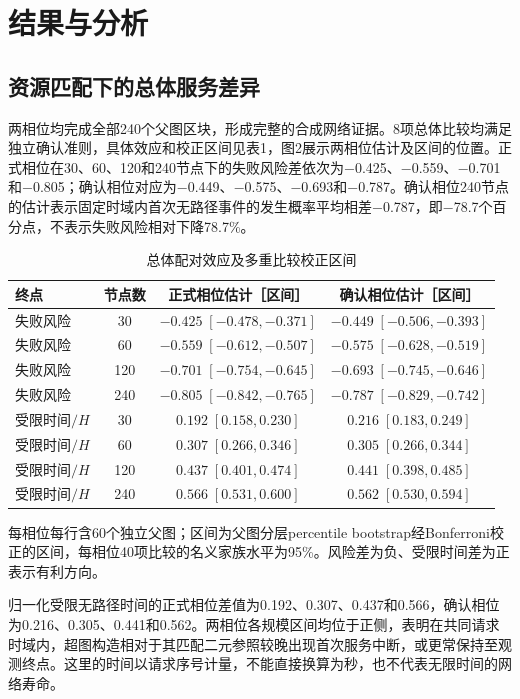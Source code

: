 \documentclass[UTF8,a4paper,twocolumn,fontset=none,zihao=5]{ctexart}
\begin{document}
\section{结果与分析}

\subsection{资源匹配下的总体服务差异}

两相位均完成全部240个父图区块，形成完整的合成网络证据。8项总体比较均满足独立确认准则，具体效应和校正区间见表1，图2展示两相位估计及区间的位置。正式相位在30、60、120和240节点下的失败风险差依次为$-$0.425、$-$0.559、$-$0.701和$-$0.805；确认相位对应为$-$0.449、$-$0.575、$-$0.693和$-$0.787。确认相位240节点的估计表示固定时域内首次无路径事件的发生概率平均相差$-$0.787，即$-$78.7个百分点，不表示失败风险相对下降78.7\%。


\begin{table}[t]\centering
\caption{总体配对效应及多重比较校正区间}\label{tab:1}
\small\begin{tabular*}{\textwidth}{@{\extracolsep{\fill}}lccc}\toprule
终点 & 节点数 & 正式相位估计［区间］ & 确认相位估计［区间］\\\midrule
失败风险 & 30 & $-0.425\;[-0.478, -0.371]$ & $-0.449\;[-0.506, -0.393]$\\
失败风险 & 60 & $-0.559\;[-0.612, -0.507]$ & $-0.575\;[-0.628, -0.519]$\\
失败风险 & 120 & $-0.701\;[-0.754, -0.645]$ & $-0.693\;[-0.745, -0.646]$\\
失败风险 & 240 & $-0.805\;[-0.842, -0.765]$ & $-0.787\;[-0.829, -0.742]$\\
受限时间$/H$ & 30 & $0.192\;[0.158, 0.230]$ & $0.216\;[0.183, 0.249]$\\
受限时间$/H$ & 60 & $0.307\;[0.266, 0.346]$ & $0.305\;[0.266, 0.344]$\\
受限时间$/H$ & 120 & $0.437\;[0.401, 0.474]$ & $0.441\;[0.398, 0.485]$\\
受限时间$/H$ & 240 & $0.566\;[0.531, 0.600]$ & $0.562\;[0.530, 0.594]$\\
\bottomrule\end{tabular*}
\par\smallskip\footnotesize 每相位每行含60个独立父图；区间为父图分层percentile bootstrap经Bonferroni校正的区间，每相位40项比较的名义家族水平为95\%。风险差为负、受限时间差为正表示有利方向。
\end{table}

归一化受限无路径时间的正式相位差值为0.192、0.307、0.437和0.566，确认相位为0.216、0.305、0.441和0.562。两相位各规模区间均位于正侧，表明在共同请求时域内，超图构造相对于其匹配二元参照较晚出现首次服务中断，或更常保持至观测终点。这里的时间以请求序号计量，不能直接换算为秒，也不代表无限时间的网络寿命。
\end{document}
